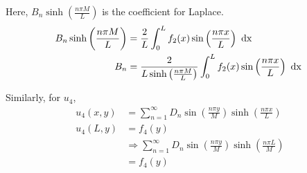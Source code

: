 \documentclass{article}
\begin{document}
Here, $B_n \sinh\left( \frac{n \pi M}{L}\right)$ is the coefficient for Laplace.
%
\begin{align}
  B_n \sinh \left( \frac{n \pi M}{L} \right) & = \frac{2}{L} \int^L_0 f_2(x) \sin\left(\frac{n \pi x}{L}\right) \text{ dx }\\
  B_n & = \frac{2}{L \sinh\left(\frac{n \pi M}{L}\right)} \int^L_0 f_2(x) \sin\left(\frac{n \pi x}{L}\right) \text{ dx }
\end{align}

Similarly, for $u_4$,
%
\begin{align}
  u_4(x, y) & = \sum^\infty_{n = 1} D_n \sin\left(\frac{n \pi y}{M}\right)\sinh\left(\frac{n \pi x}{L}\right)\\
  u_4(L, y) & = f_4(y)\\
  & \Rightarrow \sum^\infty_{n = 1} D_n \sin\left(\frac{n \pi y}{M}\right) \sinh\left(\frac{n \pi L}{M}\right)\\
  & = f_4(y)
\end{align}
\end{document}
